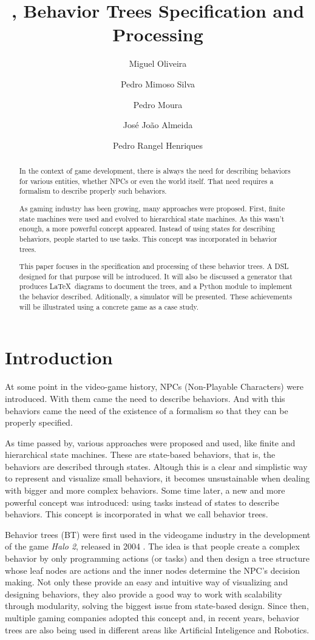 \documentclass[a4paper,UKenglish,cleveref, autoref, thm-restate]{oasics-v2019}
\title{\bht, Behavior Trees Specification and Processing} %
\author{Miguel Oliveira}{Centro ALGORITMI, DI, Universidade do Minho, Portugal}{}{}{}
\author{Pedro Mimoso Silva}{Centro ALGORITMI, DI, Universidade do Minho, Portugal}{}{}{}
\author{Pedro Moura}{Centro ALGORITMI, DI, Universidade do Minho, Portugal}{}{}{}
\author{José João Almeida}{Centro ALGORITMI, DI, Universidade do Minho, Portugal}{}{}{}
\author{Pedro Rangel Henriques}{Centro ALGORITMI, DI, Universidade do Minho, Portugal}{}{}{}
\begin{document}
\maketitle

\begin{abstract}
In the context of game development, there is always the need for describing behaviors for various entities, whether NPCs or even the world itself.
That need requires a formalism to describe properly such behaviors.

As gaming industry has been growing, many approaches were proposed.
First, finite state machines were used and evolved to hierarchical state machines.
As this wasn't enough, a more powerful concept appeared.
Instead of using states for describing behaviors, people started to use tasks.
This concept was incorporated in behavior trees.

This paper focuses in the specification and processing of these behavior trees.
A DSL designed for that purpose will be introduced.
It will also be discussed a generator that produces \LaTeX\ diagrams to document the trees, and a Python module to implement the behavior described.
Aditionally, a simulator will be presented. 
These achievements will be illustrated using a concrete game as a case study.
\end{abstract}


\section{Introduction}
\label{sec:introduction}

At some point in the video-game history, NPCs (Non-Playable Characters) were introduced. 
With them came the need to describe behaviors.
And with this behaviors came the need of the existence of a formalism so that they can be properly specified.

As time passed by, various approaches were proposed and used, like finite and hierarchical state machines.
These are state-based behaviors, that is, the behaviors are described through states.
Altough this is a clear and simplistic way to represent and visualize small behaviors, it becomes unsustainable when dealing with bigger and more complex behaviors.
Some time later, a new and more powerful concept was introduced: using tasks instead of states to describe behaviors.
This concept is incorporated in what we call behavior trees.

Behavior trees (BT) were first used in the videogame industry in the development of the game \textit{Halo 2}, released in 2004 \cite{Cuadrado2018,ColOgr2018}.
The idea is that people create a complex behavior by only programming actions (or tasks) and then design a tree structure whose leaf nodes are actions and the inner nodes determine the NPC's decision making.
Not only these provide an easy and intuitive way of visualizing and designing behaviors, they also provide a good way to work with scalability through modularity, solving the biggest issue from state-based design.
Since then, multiple gaming companies adopted this concept and, in recent years, behavior trees are also being used in different areas like Artificial Inteligence and Robotics.
\end{document}
